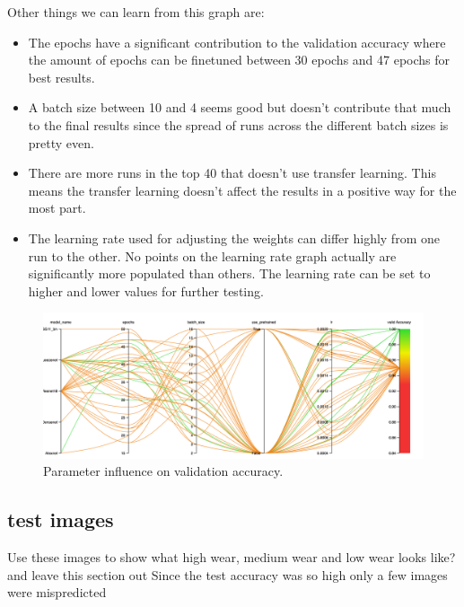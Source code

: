 Other things we can learn from this graph are:
	\begin{itemize}
		\item  The epochs have a significant contribution to the validation accuracy where the amount of epochs can be finetuned between 30 epochs and 47 epochs for best results.
		\item A batch size between 10 and 4 seems good but doesn't contribute that much to the final results since the spread of runs across the different batch sizes is pretty even.
		\item There are more runs in the top 40 that doesn't use transfer learning. This means the transfer learning doesn't affect the results in a positive way for the most part.
		\item The learning rate used for adjusting the weights can differ highly from one run to the other. No points on the learning rate graph actually are significantly more populated than others. The learning rate can be set to higher and lower values for further testing.
	\end{itemize}


	\begin{figure}[hbtp]
		\centering
		\includegraphics[width=\textwidth]{fig/results/wandb/second_handmade_sweep/charts/Section-21-Panel-0-xfrvxv29l.png}
		\caption{Parameter influence on validation accuracy.}
		\label{fig:res:shm:params}
	\end{figure}

\subsection{test images}
Use these images to show what high wear, medium wear and low wear looks like? and leave this section out
Since the test accuracy was so high only a few images were mispredicted

